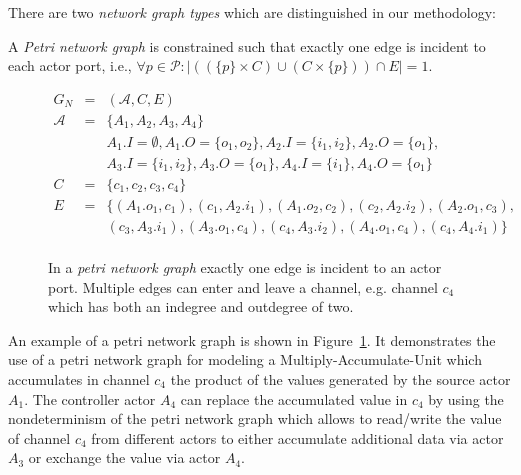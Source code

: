 There are two \emph{network graph types} which are distinguished in our methodology:

\begin{definition}\label{petri-network-graph}
  A \emph{Petri network graph} is constrained such that exactly
  one edge is incident to each actor port,
  i.e., $\forall{p \in \mathcal{P}}: |((\{p\} \times C) \cup (C \times \{p\})) \cap E| = 1$.
\end{definition}

\begin{figure}
\centering

\begin{displaymath}
\begin{array}{rcl}
  G_N & = & (\mathcal{A},C,E) \\
  \mathcal{A} & = & \{A_1,A_2,A_3,A_4\} \\
      &   & A_1.I = \emptyset, A_1.O=\{o_1,o_2\}, A_2.I = \{i_1,i_2\}, A_2.O=\{o_1\},\\
      &   & A_3.I = \{i_1,i_2\}, A_3.O=\{o_1\},A_4.I = \{i_1\}, A_4.O=\{o_1\}\\
  C   & = & \{c_1,c_2,c_3,c_4\} \\
  E   & = & \{(A_1.o_1,c_1),(c_1,A_2.i_1),(A_1.o_2,c_2),(c_2,A_2.i_2),(A_2.o_1,c_3),\\
      &   &   (c_3,A_3.i_1),(A_3.o_1,c_4),(c_4,A_3.i_2),(A_4.o_1,c_4),(c_4,A_4.i_1)\}\\
\end{array}
\end{displaymath}
\caption{\label{fig:ng-petri}In a \emph{petri network graph} exactly
  one edge is incident to an actor port. Multiple edges can
  enter and leave a channel, e.g. channel $c_4$
  which has both an indegree and outdegree of two.}
\end{figure}

  An example of a petri network graph is shown in Figure~\ref{fig:ng-petri}.
  It demonstrates the use of a petri network graph for modeling
  a Multiply-Accumulate-Unit which accumulates in channel $c_4$ the product of
  the values generated by the source actor $A_1$.
  The controller actor $A_4$ can replace the
  accumulated value in $c_4$ by using the nondeterminism
  of the petri network graph which allows to read/write the value of channel
  $c_4$ from different actors to either accumulate additional
  data via actor $A_3$ or exchange the value via actor $A_4$.

